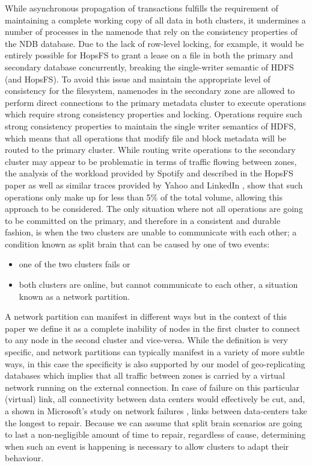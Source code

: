 While asynchronous propagation of transactions fulfills the requirement of maintaining a complete working copy of all data in both clusters, it undermines a number of processes in the namenode that rely on the consistency properties of the NDB database.
Due to the lack of row-level locking, for example, it would be entirely possible for HopsFS to grant a lease on a file in both the primary and secondary database concurrently, breaking the single-writer semantic of HDFS (and HopsFS).
To avoid this issue and maintain the appropriate level of consistency for the filesystem, namenodes in the secondary zone are allowed to perform direct connections to the primary metadata cluster to execute operations which require strong consistency properties and locking.
Operations require such strong consistency properties to maintain the single writer semantics of HDFS, which means that all operations that modify file and block metadata will be routed to the primary cluster.
While routing write operations to the secondary cluster may appear to be problematic in terms of traffic flowing between zones, the analysis of the workload provided by Spotify and described in the HopsFS paper \cite{DBLP:conf/dais/NiaziIBD15} as well as similar traces provided by Yahoo \cite{abad2014big} and LinkedIn \cite{DBLP:conf/sc/RenZPG14}, show that such operations only make up for less than 5\% of the total volume, allowing this approach to be considered.
The only situation where not all operations are going to be committed on the primary, and therefore in a consistent and durable fashion, is when the two clusters are unable to communicate with each other; a condition known as split brain that can be caused by one of two events:
\begin{itemize}
    \item one of the two clusters fails or
    \item both clusters are online, but cannot communicate to each other, a situation known as a network partition.
\end{itemize}
A network partition can manifest in different ways but in the context of this paper we define it as a complete inability of nodes in the first cluster to connect to any node in the second cluster and vice-versa.
While the definition is very specific, and network partitions can typically manifest in a variety of more subtle ways, in this case the specificity is also supported by our model of geo-replicating databases which implies that all traffic between zones is carried by a virtual network running on the external connection.
In case of failure on this particular (virtual) link, all connectivity between data centers would effectively be cut, and, a shown in Microsoft's study on network failures \cite{DBLP:conf/sigcomm/GillJN11}, links between data-centers take the longest to repair.
Because we can assume that split brain scenarios are going to last a non-negligible amount of time to repair, regardless of cause, determining when such an event is happening is necessary to allow clusters to adapt their behaviour.

